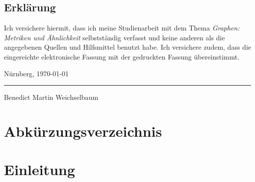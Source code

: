 \documentclass[a4paper,12pt,ngerman,chapterprefix=false,listof=totoc,bibliography=totoc]{scrreprt}
\begin{document}
\section*{Erklärung}
\thispagestyle{empty}
Ich versichere hiermit, dass ich meine Studienarbeit mit dem Thema \textit{Graphen: Metriken und Ähnlichkeit} selbstständig verfasst und keine anderen als die angegebenen Quellen und Hilfsmittel benutzt habe.
\newline
Ich versichere zudem, dass die eingereichte elektronische Fassung mit der gedruckten Fassung übereinstimmt.\vspace{1.6cm}\newline
{Nürnberg, \today\vspace{1.2cm}\par\vspace{1.5cm}}
{\noindent\rule{6cm}{.4pt}\newline Benedict Martin Weichselbaum}

\begin{abstract}
	
\end{abstract}

\setcounter{tocdepth}{3}

{\tableofcontents \thispagestyle{empty}}


\listoffigures\thispagestyle{plain}
\setcounter{page}{1}

\listoftables\thispagestyle{plain}

\chapter*{Abkürzungsverzeichnis}
\begin{acronym}

\end{acronym}


\chapter{Einleitung}
\setcounter{page}{1}
\end{document}
